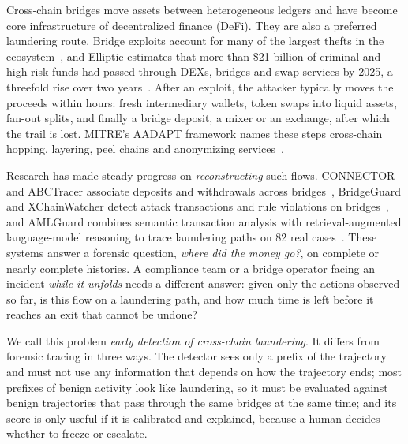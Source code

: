 \documentclass[runningheads]{llncs}
\newcommand{\1}{\mathbb{1}}
\begin{document}
Cross-chain bridges move assets between heterogeneous ledgers and have become core infrastructure of decentralized finance (DeFi).
They are also a preferred laundering route.
Bridge exploits account for many of the largest thefts in the ecosystem~\cite{lee2023sok}, and Elliptic estimates that more than \$21 billion of criminal and high-risk funds had passed through DEXs, bridges and swap services by 2025, a threefold rise over two years~\cite{elliptic2025crosschain}.
After an exploit, the attacker typically moves the proceeds within hours: fresh intermediary wallets, token swaps into liquid assets, fan-out splits, and finally a bridge deposit, a mixer or an exchange, after which the trail is lost.
MITRE's AADAPT framework names these steps cross-chain hopping, layering, peel chains and anonymizing services~\cite{mitre2025aadapt}.

Research has made steady progress on \emph{reconstructing} such flows.
CONNECTOR and ABCTracer associate deposits and withdrawals across bridges~\cite{lin2025connector,lin2025abctracer}, BridgeGuard and XChainWatcher detect attack transactions and rule violations on bridges~\cite{wu2025safeguarding,augusto2025xchainwatcher}, and AMLGuard combines semantic transaction analysis with retrieval-augmented language-model reasoning to trace laundering paths on 82 real cases~\cite{wu2026amlguard}.
These systems answer a forensic question, \emph{where did the money go?}, on complete or nearly complete histories.
A compliance team or a bridge operator facing an incident \emph{while it unfolds} needs a different answer: given only the actions observed so far, is this flow on a laundering path, and how much time is left before it reaches an exit that cannot be undone?

We call this problem \emph{early detection of cross-chain laundering}.
It differs from forensic tracing in three ways.
The detector sees only a prefix of the trajectory and must not use any information that depends on how the trajectory ends; most prefixes of benign activity look like laundering, so it must be evaluated against benign trajectories that pass through the same bridges at the same time; and its score is only useful if it is calibrated and explained, because a human decides whether to freeze or escalate.
\end{document}
